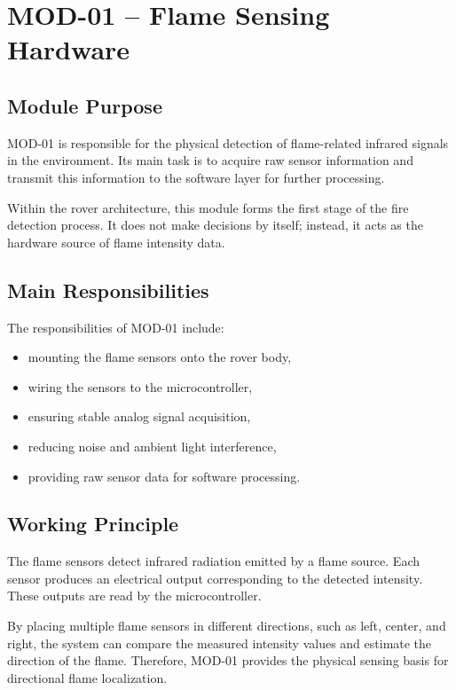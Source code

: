 \documentclass[12pt,a4paper]{article}
\begin{document}
\section{MOD-01 -- Flame Sensing Hardware}

\subsection{Module Purpose}

MOD-01 is responsible for the physical detection of flame-related infrared signals in the environment. Its main task is to acquire raw sensor information and transmit this information to the software layer for further processing.

Within the rover architecture, this module forms the first stage of the fire detection process. It does not make decisions by itself; instead, it acts as the hardware source of flame intensity data.

\subsection{Main Responsibilities}

The responsibilities of MOD-01 include:

\begin{itemize}[leftmargin=1.2cm]
    \item mounting the flame sensors onto the rover body,
    \item wiring the sensors to the microcontroller,
    \item ensuring stable analog signal acquisition,
    \item reducing noise and ambient light interference,
    \item providing raw sensor data for software processing.
\end{itemize}

\subsection{Working Principle}

The flame sensors detect infrared radiation emitted by a flame source. Each sensor produces an electrical output corresponding to the detected intensity. These outputs are read by the microcontroller.

By placing multiple flame sensors in different directions, such as left, center, and right, the system can compare the measured intensity values and estimate the direction of the flame. Therefore, MOD-01 provides the physical sensing basis for directional flame localization.
\end{document}
